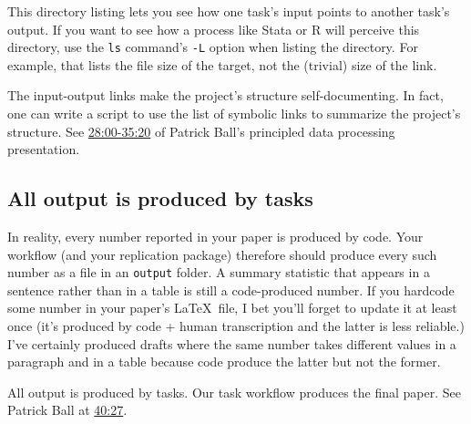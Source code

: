 This directory listing lets you see how one task's input points to another task's output.
If you want to see how a process like Stata or R will perceive this directory,
use the \texttt{ls} command's \texttt{-L} option when listing the directory.
For example, that lists the file size of the target, not the (trivial) size of the link.

The input-output links make the project's structure self-documenting.
In fact, one can write a script to use the list of symbolic links to summarize the project's structure. See \href{https://www.youtube.com/watch?v=ZSunU9GQdcI&t=28m00s}{28:00-35:20} of Patrick Ball's principled data processing presentation.



\subsection{All output is produced by tasks}

In reality, every number reported in your paper is produced by code.
Your workflow (and your replication package) therefore should produce every such number as a file in an \texttt{output} folder.
A summary statistic that appears in a sentence rather than in a table is still a code-produced number.
If you hardcode some number in your paper's \LaTeX\ file, I bet you'll forget to update it at least once (it's produced by code + human transcription and the latter is less reliable.)
I've certainly produced drafts where the same number takes different values in a paragraph and in a table because code produce the latter but not the former.

All output is produced by tasks.
Our task workflow produces the final paper.
See Patrick Ball at \href{https://www.youtube.com/watch?v=ZSunU9GQdcI&t=40m27s}{40:27}.

